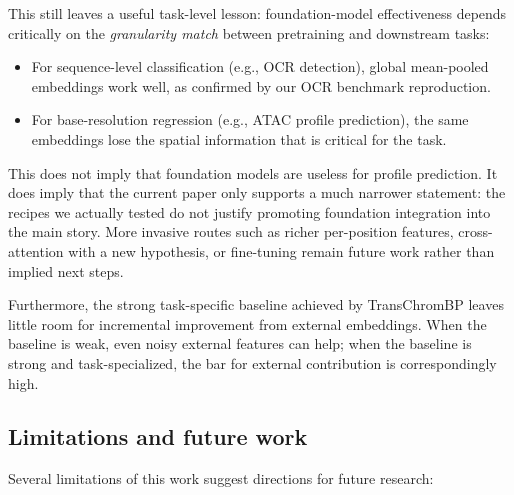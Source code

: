\documentclass[11pt,a4paper]{article}
\begin{document}
This still leaves a useful task-level lesson: foundation-model
effectiveness depends critically on the \emph{granularity match} between
pretraining and downstream tasks:

\begin{itemize}[leftmargin=2em]
  \item For sequence-level classification (e.g., OCR detection), global
  mean-pooled embeddings work well, as confirmed by our OCR benchmark
  reproduction.
  \item For base-resolution regression (e.g., ATAC profile prediction),
  the same embeddings lose the spatial information that is critical for
  the task.
\end{itemize}

\noindent This does not imply that foundation models are useless for
profile prediction. It does imply that the current paper only supports a
much narrower statement: the recipes we actually tested do not justify
promoting foundation integration into the main story. More invasive
routes such as richer per-position features, cross-attention with a new
hypothesis, or fine-tuning remain future work rather than implied next
steps.

Furthermore, the strong task-specific baseline achieved by TransChromBP
leaves little room for incremental improvement from external embeddings.
When the baseline is weak, even noisy external features can help;
when the baseline is strong and task-specialized, the bar for external
contribution is correspondingly high.

\subsection{Limitations and future work}

Several limitations of this work suggest directions for future research:
\end{document}
